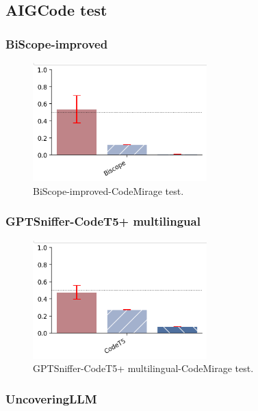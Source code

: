 \subsection{AIGCode test}

\subsubsection{BiScope-improved}
\begin{figure}[H]
    \centering
    \includegraphics[width=0.6\textwidth]{img/BiScope/AIG.png}
    \caption{BiScope-improved-CodeMirage test.}
    \label{fig:BiScope-improved-CodeMirage test}
\end{figure}

\subsubsection{GPTSniffer-CodeT5+ multilingual}
\begin{figure}[H]
    \centering
    \includegraphics[width=0.6\textwidth]{img/CodeT5/AIG.png}
    \caption{GPTSniffer-CodeT5+ multilingual-CodeMirage test.}
    \label{fig:GPTSniffer-CodeT5+ multilingual-CodeMirage test}
\end{figure}


\subsubsection{UncoveringLLM}




